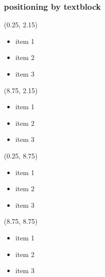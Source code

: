 \begin{frame}
\frametitle{positioning by textblock}
\vspace{-7 cm}
\begin{textblock}{8}(0.25, 2.15) %
\begin{itemize}
\item item 1
\item item 2
\item item 3
\end{itemize}
\end{textblock}
\begin{textblock}{8}(8.75, 2.15) %
\begin{itemize}
\item item 1
\item item 2
\item item 3
\end{itemize}
\end{textblock}
\begin{textblock}{8}(0.25, 8.75) %
\begin{itemize}
\item item 1
\item item 2
\item item 3
\end{itemize}
\end{textblock}
\begin{textblock}{8}(8.75, 8.75) %
\begin{itemize}
\item item 1
\item item 2
\item item 3
\end{itemize}
\end{textblock}
\end{frame}

